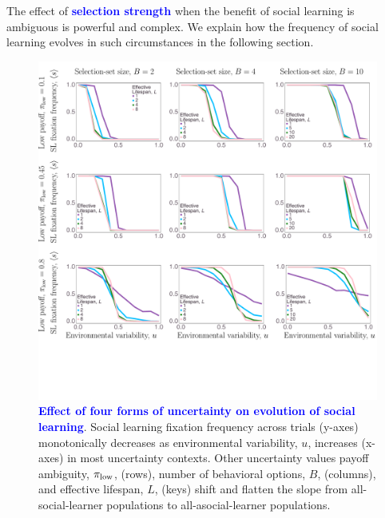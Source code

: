 \documentclass[letterpaper,11.5pt]{scrartcl}
\newcommand{\cm}[1]{{\textcolor{mypurple} {({\tiny CM:} #1)}}}
\newcommand{\edit}[1]{{\bfseries \textcolor{blue} {#1}}}
\begin{document}
The effect of \edit{selection strength} when the benefit of social learning is ambiguous is powerful and complex. We explain how the frequency of social learning evolves in such circumstances in the following section.



\begin{figure}
  \caption{\edit{Effect of four forms of uncertainty on evolution of social learning}. Social learning fixation frequency across trials (y-axes) monotonically decreases as 
  environmental variability, $u$, increases (x-axes) in most uncertainty contexts. 
  Other uncertainty values payoff ambiguity, $\pi_{\mathrm{low}}$, (rows), number of behavioral options, $B$, (columns), and effective lifespan, $L$, (keys) shift and flatten the slope from all-social-learner populations to all-asocial-learner
  populations.}
  \label{fig:mainResults}
  \centering
    \includegraphics[width=\textwidth]{Figures/mainResultsPlots.pdf}
\end{figure}
\end{document}
